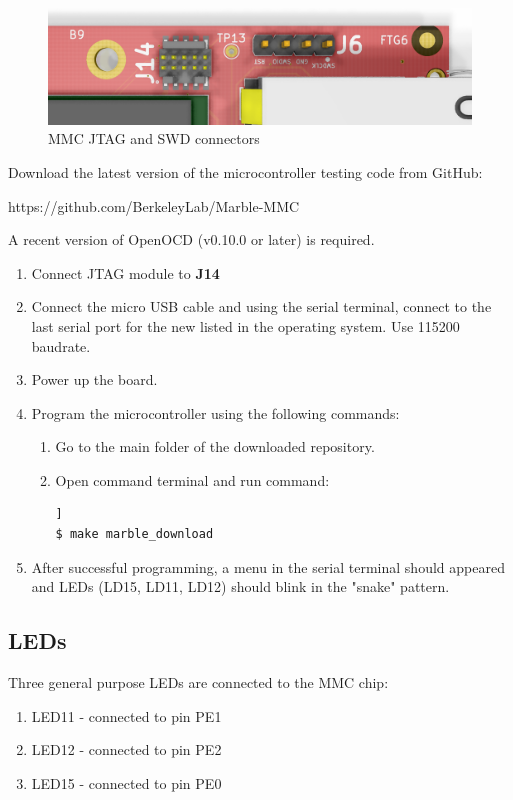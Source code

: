 \documentclass[12pt,oneside,a4]{article}
\begin{document}
\begin{figure}[H]
\begin{center}
\includegraphics[width=1\linewidth]{mmcjtagswd.png}
 \caption{MMC JTAG and SWD connectors}\label{mmcjtagswd}
\end{center}
\end{figure}

Download the latest version of the microcontroller testing code from GitHub:
\begin{leftbar}
https://github.com/BerkeleyLab/Marble-MMC
\end{leftbar}

A recent version of OpenOCD (v0.10.0 or later) is required.
\begin{enumerate}
	\item Connect JTAG module to \textbf{J14}
	\item Connect the micro USB cable and using the serial terminal, connect to the last serial port for the new listed in the operating system. Use 115200 baudrate.
	\item Power up the board.
	\item Program the microcontroller using the following commands:
	\begin{enumerate}
	\item Go to the main folder of the downloaded repository.
	\item Open command terminal and run command:
	\begin{lstlisting}[backgroundcolor = \color{Gainsboro}, language=bash, frame=none]]
$ make marble_download
	\end{lstlisting}
	\end{enumerate}
	\item After successful programming, a menu in the serial terminal should appeared and LEDs (LD15, LD11, LD12) should blink in the "snake" pattern.
\end{enumerate}
\subsection{LEDs}
Three general purpose LEDs are connected to the MMC chip:
\begin{enumerate}
	\item LED11 - connected to pin PE1
	\item LED12 - connected to pin PE2
	\item LED15 - connected to pin PE0
\end{enumerate}
\end{document}
